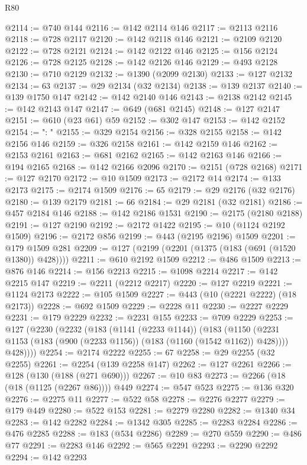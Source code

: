 \begin{lexlean}{R80}
\begin{coremodule}
@2114 := @740 @144
@2116 := @142 @2114 @146
@2117 := @2113 @2116
@2118 := @728 @2117
@2120 := @142 @2118 @146
@2121 := @2109 @2120
@2122 := @728 @2121
@2124 := @142 @2122 @146
@2125 := @156 @2124
@2126 := @728 @2125
@2128 := @142 @2126 @146
@2129 := @493 @2128
@2130 := @710 @2129
@2132 := @1390 (@2099 @2130)
@2133 := @127 @2132
@2134 := 63
@2137 := @29 @2134 (@32 @2134)
@2138 := @139 @2137
@2140 := @139 @1750 @147
@2142 := @142 @2140 @146
@2143 := @2138 @2142
@2145 := @142 @2143 @147
@2147 := @649 (@681 @2145)
@2148 := @127 @2147
@2151 := @610 (@23 @61) @59
@2152 := @302 @147
@2153 := @142 @2152
@2154 := ": "
@2155 := @329 @2154
@2156 := @328 @2155
@2158 := @142 @2156 @146
@2159 := @326 @2158
@2161 := @142 @2159 @146
@2162 := @2153 @2161
@2163 := @681 @2162
@2165 := @142 @2163 @146
@2166 := @194 @2165
@2168 := @142 @2166 @2096
@2170 := @2151 (@728 @2168)
@2171 := @127 @2170
@2172 := @10 @1509
@2173 := @2172 @14
@2174 := @133 @2173
@2175 := @2174 @1509
@2176 := 65
@2179 := @29 @2176 (@32 @2176)
@2180 := @139 @2179
@2181 := 66
@2184 := @29 @2181 (@32 @2181)
@2186 := @457 @2184 @146
@2188 := @142 @2186 @1531
@2190 := @2175 (@2180 @2188)
@2191 := @127 @2190
@2192 := @2172 @1422
@2195 := @10 (@1124 @2192 @1509)
@2196 := @2172 @856
@2199 := @443 (@2195 @2196) @1509
@2201 := @179 @1509 @281
@2209 := @127 (@2199 (@2201 (@1375 (@183 (@691 (@1520 @1380)) @428))))
@2211 := @610 @2192 @1509
@2212 := @486 @1509
@2213 := @876 @146
@2214 := @156 @2213
@2215 := @1098 @2214
@2217 := @142 @2215 @147
@2219 := @2211 (@2212 @2217)
@2220 := @127 @2219
@2221 := @1124 @2173
@2222 := @105 @1509
@2227 := @443 (@10 (@2221 @2222) (@18 @2173))
@2228 := @692 @1509
@2229 := @2228 @11
@2230 := @2227 @2229
@2231 := @179 @2229
@2232 := @2231 @155
@2233 := @709 @2229
@2253 := @127
    (@2230
      (@2232
        (@183
          (@1141 (@2233 @1144))
          (@183
            (@1150 (@2231 @1153 (@183 (@900 (@2233 @1156)) (@183 (@1160 (@1542 @1162)) @428))))
            @428))))
@2254 := @2174 @2222
@2255 := 67
@2258 := @29 @2255 (@32 @2255)
@2261 := @2254 (@139 @2258 @147)
@2262 := @127 @2261
@2266 := @128 (@130 (@188 (@271 @690)))
@2267 := @10 @83
@2273 := @2266 (@18 (@18 (@1125 (@2267 @86)))) @449
@2274 := @547 @523
@2275 := @136 @320
@2276 := @2275 @11
@2277 := @522 @58
@2278 := @2276 @2277
@2279 := @179 @449
@2280 := @522 @153
@2281 := @2279 @2280
@2282 := @1340 @34
@2283 := @142 @2282
@2284 := @1342 @305
@2285 := @2283 @2284
@2286 := @476 @2285
@2288 := @183 (@534 @2286)
@2289 := @270 @559
@2290 := @486 @77
@2291 := @2283 @146
@2292 := @565 @2291
@2293 := @2290 @2292
@2294 := @142 @2293

\end{coremodule}
\end{lexlean}
